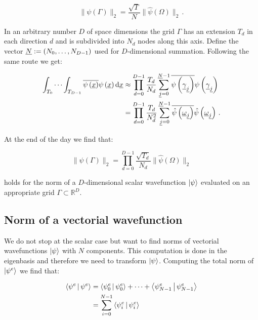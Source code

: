 \begin{equation*}
  \|\psi(\Gamma)\|_2 = \frac{\sqrt{T}}{N} \|\hat{\psi}(\Omega)\|_2 \,.
\end{equation*}

In an arbitrary number $D$ of space dimensions the grid $\Gamma$ has an extension
$T_d$ in each direction $d$ and is subdivided into $N_d$ nodes along this axis.
Define the vector $\underline{N} := (N_0,\ldots,N_{D-1})$ used for $D$-dimensional
summation. Following the same route we get:

\begin{align*}
  \int_{T_0} \cdots \int_{T_{D-1}} \overline{\psi\left(\underline{x}\right)} \psi\left(\underline{x}\right) \mathrm{d} \underline{x}
  & \approx
 \prod_{d=0}^{D-1} \frac{T_d}{N_d} \sum_{\underline{j}=0}^{\underline{N}-1}
                              \overline{\psi\left(\underline{\gamma}_{\underline{j}}\right)} \psi\left(\underline{\gamma}_{\underline{j}}\right) \\
  & = \prod_{d=0}^{D-1} \frac{T_d}{N_d^2} \sum_{\underline{j}=0}^{\underline{N}-1}
                              \overline{\hat{\psi}\left(\underline{\omega}_{\underline{j}}\right)} \hat{\psi}\left(\underline{\omega}_{\underline{j}}\right) \,.
\end{align*}

At the end of the day we find that:

\begin{equation} \label{eq:norm_wf_scalar}
  \|\psi(\Gamma)\|_2 = \prod_{d=0}^{D-1} \frac{\sqrt{T_d}}{N_d} \|\hat{\psi}(\Omega)\|_2
\end{equation}

holds for the norm of a $D$-dimensional scalar wavefunction $\Ket{\psi}$
evaluated on an appropriate grid $\Gamma \subset \mathbb{R}^D$.


\subsection{Norm of a vectorial wavefunction}


We do not stop at the scalar case but want to find norms of
vectorial wavefunctions $\Ket{\psi}$ with $N$ components.
This computation is done in the eigenbasis and therefore we
need to transform $\Ket{\psi}$. Computing the total norm of
$\Ket{\psi^{e}}$ we find that:

\begin{align*}
  \Braket{\psi^{e}|\psi^{e}}
  & = \Braket{\psi^{e}_0|\psi^{e}_0} + \cdots + \Braket{\psi^{e}_{N-1}|\psi^{e}_{N-1}} \\
  & = \sum_{i=0}^{N-1} \Braket{\psi^{e}_i|\psi^{e}_i}
\end{align*}

